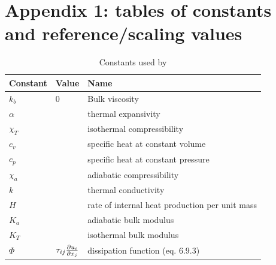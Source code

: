 \documentclass[document.tex]{subfiles}
\begin{document}
\section{Appendix 1: tables of constants and reference/scaling values}
\begin{table}[ht] 
    \centering
    \caption{Constants used by \cite{scto01}}
    \label{schubert constants}
    \begin{tabular}{lll}
        \toprule
        Constant & Value & Name \\
        \midrule
        $k_b$  & 0 & Bulk viscosity \\
        $\alpha$  &  & thermal expansivity \\
        $\chi_T$  &  & isothermal compressibility \\
        $c_v$  &  & specific heat at constant volume \\
        $c_p$  &  & specific heat at constant pressure \\
        $\chi_a$ & & adiabatic compressibility \\
        $k$  &  & thermal conductivity \\
        $H$  &   & rate of internal heat production per unit mass \\
        $K_a$ &  & adiabatic bulk modulus \\
        $K_T$ & & isothermal bulk modulus\\
        $\Phi$ & $\tau_{ij}\pdv{u_i}{x_j}$ & dissipation function (eq. 6.9.3) \\
        \bottomrule
    \end{tabular}
\end{table}
\end{document}
